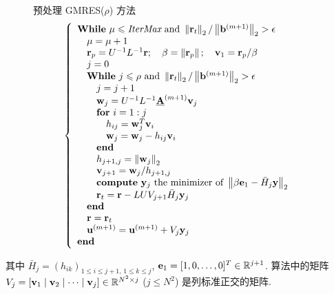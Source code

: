 \begin{figure}[!t]
\begin{algorithm}{预处理 GMRES($\rho$) 方法}
  \label{alg:10-1}
  \[
    \left\{
    \begin{array}{l}
      \textbf{While}\ \mu\leqslant \textit{IterMax}\ \text{and}\ \norm{\mathbf{r}_{t}}_{2}/\norm{\mathbf{b}^{(m+1)}}_{2}>\epsilon\\
      \quad \mu=\mu+1\\
      \quad \mathbf{r}_{p}=U^{-1}L^{-1}\mathbf{r};\quad \beta=\norm{\mathbf{r}_{p}};\quad \mathbf{v}_{1}=\mathbf{r}_{p}/\beta\\
      \quad j=0\\
      \quad \textbf{While}\ j\leqslant\rho\ \text{and}\ \norm{\mathbf{r}_{t}}_{2}/\norm{\mathbf{b}^{(m+1)}}_{2}>\epsilon\\
      \qquad j=j+1\\
      \qquad \mathbf{w}_{j}=U^{-1}L^{-1}\underline{\mathbf{A}}^{(m+1)}\mathbf{v}_{j}\\
      \qquad \textbf{for}\ i=1:j\\
      \qquad\quad h_{ij}=\mathbf{w}_{j}^{T}\mathbf{v}_{i}\\
      \qquad\quad \mathbf{w}_{j}=\mathbf{w}_{j}-h_{ij}\mathbf{v}_{i}\\
      \qquad \textbf{end}\\
      \qquad h_{j+1,j}=\norm{\mathbf{w}_{j}}_{2}\\
      \qquad \mathbf{v}_{j+1}=\mathbf{w}_{j}/h_{j+1,j}\\
      \qquad \textbf{compute}\ \mathbf{y}_{j}\ \text{the minimizer of}\ \norm{\beta\mathbf{e}_{1}-\bar{H}_{j}\mathbf{y}}_{2}\\
      \qquad \mathbf{r}_{t}=\mathbf{r}-LUV_{j+1}\bar{H}_{j}\mathbf{y}_{j}\\
      \quad \textbf{end}\\
      \quad \mathbf{r}=\mathbf{r}_{t}\\
      \quad \mathbf{u}^{(m+1)}=\mathbf{u}^{(m+1)}+V_{j}\mathbf{y}_{j}\\
      \textbf{end}
    \end{array}
    \right.
  \]
\end{algorithm}
\end{figure}

其中 $\bar{H}_{j}=(h_{ik})_{1\leqslant i\leqslant j+1,\,1\leqslant k\leqslant j}$, $\mathbf{e}_{1}=[1,0,\ldots,0]^{T}\in\mathbb{R}^{j+1}$. 算法中的矩阵 $V_{j}=[\mathbf{v}_{1}\mid\mathbf{v}_{2}\mid\cdots\mid\mathbf{v}_{j}]\in\mathbb{R}^{N^{2}\times j}$ ($j\leqslant N^{2}$) 是列标准正交的矩阵.

